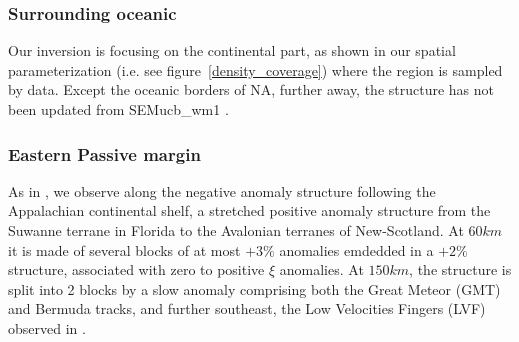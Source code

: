 \documentclass[12pt]{article}
\begin{document}
			






\subsubsection{Surrounding oceanic} 

	Our inversion is focusing on the continental part, as shown in our spatial parameterization (i.e. see figure~\ref{density_coverage}) where the region is sampled by data.
	Except the oceanic borders of NA, further away, the structure has not been updated from SEMucb\_wm1 \citep{french2014whole}. 

	\subsubsection{Eastern Passive margin}
		As in \cite{schaeffer2014imaging,yuan2014lithospheric,james2014rayleigh,silveira2002anisotropic,mocquet1990three}, we observe along the negative anomaly structure following the Appalachian continental shelf, a stretched positive anomaly structure from the Suwanne terrane in Florida to the Avalonian terranes of New-Scotland. 
		At $60km$ it is made of several blocks of at most $+3\%$ anomalies emdedded in a $+2\%$ structure, associated with zero to positive $\xi$ anomalies. At $150km$, the structure is split into 2 blocks by a slow anomaly comprising both the Great Meteor (GMT) and Bermuda tracks, and further southeast, the Low Velocities Fingers (LVF) observed in \cite{french2013waveform}. 
\end{document}
